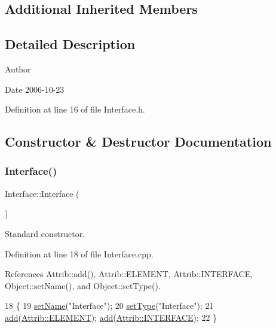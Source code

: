 \subsection*{Additional Inherited Members}


\subsection{Detailed Description}
\begin{DoxyAuthor}{Author}

\end{DoxyAuthor}
\begin{DoxyDate}{Date}
2006-\/10-\/23 
\end{DoxyDate}


Definition at line 16 of file Interface.\+h.



\subsection{Constructor \& Destructor Documentation}
\mbox{\label{classInterface_a4406d74c75bdfe150bf72be1f1cda8b1}} 
\subsubsection{\texorpdfstring{Interface()}{Interface()}}
{\footnotesize\ttfamily Interface\+::\+Interface (\begin{DoxyParamCaption}{ }\end{DoxyParamCaption})}



Standard constructor. 



Definition at line 18 of file Interface.\+cpp.



References Attrib\+::add(), Attrib\+::\+E\+L\+E\+M\+E\+NT, Attrib\+::\+I\+N\+T\+E\+R\+F\+A\+CE, Object\+::set\+Name(), and Object\+::set\+Type().


\begin{DoxyCode}
18                        \{
19   \hyperlink{classObject_ae30fea75683c2d149b6b6d17c09ecd0c}{setName}(\textcolor{stringliteral}{"Interface"});
20   \hyperlink{classObject_aae534cc9d982bcb9b99fd505f2e103a5}{setType}(\textcolor{stringliteral}{"Interface"});
21   \hyperlink{classAttrib_a235f773af19c900264a190b00a3b4ad7}{add}(\hyperlink{classAttrib_a69e171d7cc6417835a5a306d3c764235a7788bc5dd333fd8ce18562b269c9dab1}{Attrib::ELEMENT}); \hyperlink{classAttrib_a235f773af19c900264a190b00a3b4ad7}{add}(\hyperlink{classAttrib_a69e171d7cc6417835a5a306d3c764235aa27c16b480a369ea4d18b07b2516bbc7}{Attrib::INTERFACE});
22 \}
\end{DoxyCode}
\mbox{\label{classInterface_a19179888f29f18f1be54a3dfe98f68c0}} 
